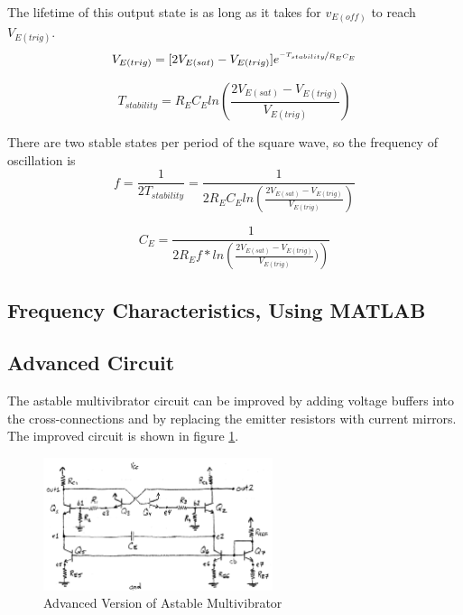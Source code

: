 \documentclass[titlepage, letterpaper, 10.5pt]{article}
\begin{document}
The lifetime of this output state is as long as it takes for $v_{E(off)}$ to reach $V_{E(trig)}$.
\begin{equation*}
V_{E(trig)}=[2V_{E(sat)}-V_{E(trig)}]e^{\nicefrac{-T_{stability}}{R_{E}C_{E}}}
\end{equation*}

\begin{equation*}
T_{stability}=R_{E}C_{E}ln\left(\frac{2V_{E(sat)}-V_{E(trig)}}{V_{E(trig)}}\right)
\end{equation*}

There are two stable states per period of the square wave, so the frequency of oscillation is
\begin{equation}
f=\frac{1}{2T_{stability}}=\frac{1}{2R_{E}C_{E}ln\left(\frac{2V_{E(sat)}-V_{E(trig)}}{V_{E(trig)}}\right)}
\end{equation}

\begin{equation}
C_{E}=\frac{1}{2R_{E}f*ln\left(\frac{2V_{E(sat)}-V_{E(trig)}}{V_{E(trig)}})\right)}
\label{ce-eq}
\end{equation}
\subsection{Frequency Characteristics, Using MATLAB}

\subsection{Advanced Circuit}

The astable multivibrator circuit can be improved by adding voltage buffers into
the cross-connections and by replacing the emitter resistors with current mirrors.
The improved circuit is shown in figure \ref{advanced-circuit}.

\begin{figure}[ht]
	\centering
	\includegraphics[width=0.6\textwidth]{diagrams/advanced-circuit}
	\caption{Advanced Version of Astable Multivibrator}
	\label{advanced-circuit}
\end{figure}
\end{document}
